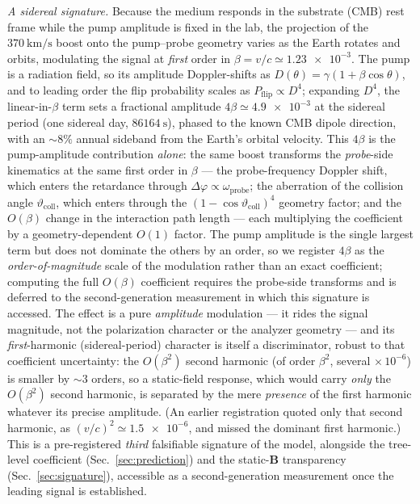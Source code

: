 \documentclass[aps,prd,twocolumn,superscriptaddress,nofootinbib,longbibliography]{revtex4-2}
\newcommand{\Pflip}{P_{\mathrm{flip}}}
\begin{document}
\emph{A sidereal signature.} Because the medium responds in the substrate (CMB)
rest frame while the pump amplitude is fixed in the lab, the projection of the
$\SI{370}{\kilo\meter\per\second}$ boost onto the pump--probe geometry varies as
the Earth rotates and orbits, modulating the signal at \emph{first} order in
$\beta=v/c\simeq\num{1.23e-3}$. The pump is a radiation field, so its amplitude Doppler-shifts as
$D(\theta)=\gamma(1+\beta\cos\theta)$, and to leading order the flip probability
scales as $\Pflip\propto D^4$; expanding $D^4$, the linear-in-$\beta$ term sets a
fractional amplitude $4\beta\simeq\num{4.9e-3}$ at the sidereal period (one
sidereal day, $\SI{86164}{\second}$), phased to the known CMB dipole direction,
with an $\sim\!8\%$ annual sideband from the Earth's orbital velocity. This
$4\beta$ is the pump-amplitude contribution \emph{alone}: the same boost
transforms the \emph{probe}-side kinematics at the same first order in $\beta$ ---
the probe-frequency Doppler shift, which enters the retardance through
$\Delta\varphi\propto\omega_{\mathrm{probe}}$; the aberration of the collision
angle $\vartheta_{\mathrm{coll}}$, which enters through the
$(1-\cos\vartheta_{\mathrm{coll}})^4$ geometry factor; and the $O(\beta)$ change
in the interaction path length --- each multiplying the coefficient by a
geometry-dependent $O(1)$ factor. The pump amplitude is the single largest term
but does not dominate the others by an order, so we register $4\beta$ as the
\emph{order-of-magnitude} scale of the modulation rather than an exact
coefficient; computing the full $O(\beta)$ coefficient requires the probe-side
transforms and is deferred to the second-generation measurement in which this
signature is accessed. The effect is a pure \emph{amplitude} modulation --- it
rides the signal magnitude, not the polarization character or the analyzer
geometry --- and its \emph{first}-harmonic (sidereal-period) character is itself a
discriminator, robust to that coefficient uncertainty: the $O(\beta^2)$ second
harmonic (of order $\beta^2$, several $\times\,10^{-6}$) is smaller by $\sim\!3$
orders, so a
static-field response, which would carry \emph{only} the $O(\beta^2)$ second
harmonic, is separated by the mere \emph{presence} of the first harmonic whatever
its precise amplitude. (An earlier registration quoted only that second harmonic,
as $(v/c)^2\simeq\num{1.5e-6}$, and missed the dominant first harmonic.) This is
a pre-registered \emph{third} falsifiable signature of the model, alongside the
tree-level coefficient (Sec.~\ref{sec:prediction}) and the static-$\mathbf B$
transparency (Sec.~\ref{sec:signature}), accessible as a second-generation
measurement once the leading signal is established.
\end{document}
